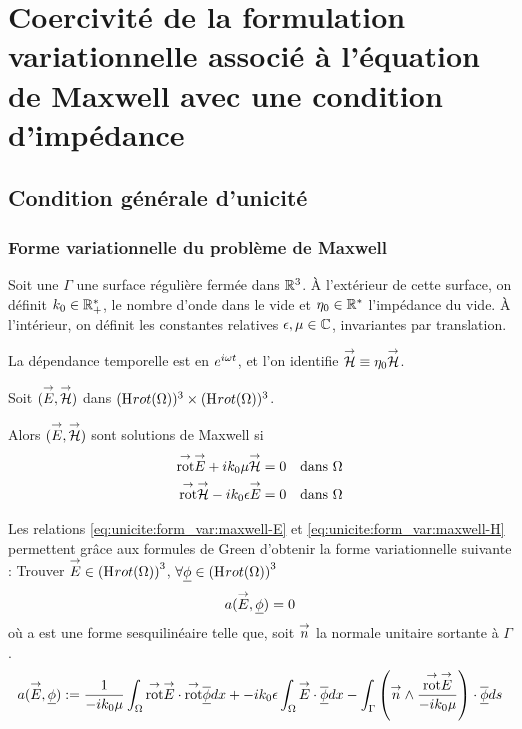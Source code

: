 \section{Coercivité de la formulation variationnelle associé à l'équation de Maxwell avec une condition d'impédance}
	\subsection{Condition générale d'unicité}
		\subsubsection{Forme variationnelle du problème de Maxwell}

			Soit une $\Gamma$ une surface régulière fermée dans $\mathbb R^3$. 
			À l'extérieur de cette surface, on définit $k_0 \in \mathbb R_+^*$, le nombre d'onde dans le vide et $\eta_0 \in \mathbb R^*$ l'impédance du vide.
			À l'intérieur, on définit les constantes relatives $\epsilon,\mu \in \mathbb C$, invariantes par translation.

			\begin{tcolorbox}
				\centering
				La dépendance temporelle est en $e^{i\omega t}$, et l'on identifie ${\overset{\rightarrow}{\mathcal{H}}} \equiv \eta _0 {\overset{\rightarrow}{\mathcal{H}}}$.
			\end{tcolorbox}

			Soit $({\overset{\rightarrow}{E}},{\overset{\rightarrow}{\mathcal{H}}})$ dans $(\mathrm{H}_\mathrm{{}}{rot}(\Omega))^3 \times (\mathrm{H}_\mathrm{{}}{rot}(\Omega))^3$. 

			Alors $({\overset{\rightarrow}{E}},{\overset{\rightarrow}{\mathcal{H}}})$ sont solutions de Maxwell si 
			\begin{align}
				\label{eq:unicite:form_var:maxwell-E}
				\trot \vE + ik_0 \mu \vH &= 0 && \text{dans $\OO$}
				\\\label{eq:unicite:form_var:maxwell-H}
				\trot \vH - ik_0\eps \vE &= 0 && \text{dans $\OO$}
			\end{align}

			Les relations \eqref{eq:unicite:form_var:maxwell-E} et \eqref{eq:unicite:form_var:maxwell-H} permettent grâce aux formules de Green d'obtenir la forme variationnelle suivante :
			Trouver ${\overset{\rightarrow}{E}} \in \left(\mathrm{H}_\mathrm{{}}{rot}(\Omega)\right)^3$, $\forall \underline{\phi} \in \left(\mathrm{H}_\mathrm{{}}{rot}(\Omega)\right)^3$
			\[
				a({\overset{\rightarrow}{E}},\underline{\phi}) = 0
			\]
			où a est une forme sesquilinéaire telle que, soit ${\overset{\rightarrow}{n}}$ la normale unitaire sortante à $\Gamma$.
			\begin{align*}
				a({\overset{\rightarrow}{E}},\underline{\phi}) &:=  \dfrac{1}{-ik_0\mu} \int_\Omega {{\overset{\rightarrow}{\operatorname{rot}}}} {\overset{\rightarrow}{E}} \cdot {{\overset{\rightarrow}{\operatorname{rot}}}} {\overline{\underline{\phi}}} dx + -ik_0\epsilon\int_\Omega{\overset{\rightarrow}{E}}\cdot{\overline{\underline{\phi}}} dx
				 - \int_\Gamma \left({\overset{\rightarrow}{n}} \wedge \dfrac{{{\overset{\rightarrow}{\operatorname{rot}}}} {\overset{\rightarrow}{E}}}{-ik_0\mu}\right) \cdot {\overline{\underline{\phi}}} ds \\
			 \end{align*}

